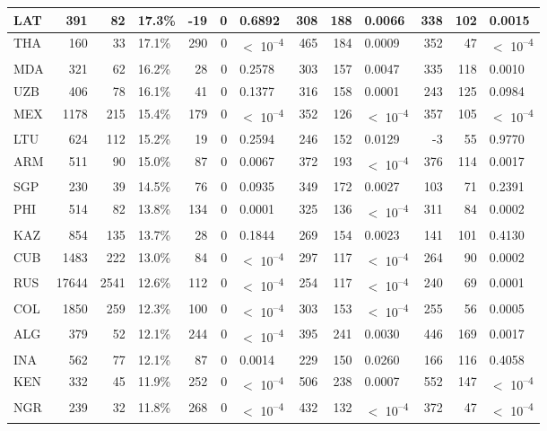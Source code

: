\begin{tabular}{l|r|r|l|r|r|l|r|r|l|r|r|l}
\hline
LAT & 391 & 82 & 17.3\% & -19 & 0 & 0.6892 & 308 & 188 & 0.0066 & 338 & 102 & 0.0015\\
\hline
THA & 160 & 33 & 17.1\% & 290 & 0 & $<$ 10\textsuperscript{--4} & 465 & 184 & 0.0009 & 352 & 47 & $<$ 10\textsuperscript{--4}\\
\hline
MDA & 321 & 62 & 16.2\% & 28 & 0 & 0.2578 & 303 & 157 & 0.0047 & 335 & 118 & 0.0010\\
\hline
UZB & 406 & 78 & 16.1\% & 41 & 0 & 0.1377 & 316 & 158 & 0.0001 & 243 & 125 & 0.0984\\
\hline
MEX & 1178 & 215 & 15.4\% & 179 & 0 & $<$ 10\textsuperscript{--4} & 352 & 126 & $<$ 10\textsuperscript{--4} & 357 & 105 & $<$ 10\textsuperscript{--4}\\
\hline
LTU & 624 & 112 & 15.2\% & 19 & 0 & 0.2594 & 246 & 152 & 0.0129 & -3 & 55 & 0.9770\\
\hline
ARM & 511 & 90 & 15.0\% & 87 & 0 & 0.0067 & 372 & 193 & $<$ 10\textsuperscript{--4} & 376 & 114 & 0.0017\\
\hline
SGP & 230 & 39 & 14.5\% & 76 & 0 & 0.0935 & 349 & 172 & 0.0027 & 103 & 71 & 0.2391\\
\hline
PHI & 514 & 82 & 13.8\% & 134 & 0 & 0.0001 & 325 & 136 & $<$ 10\textsuperscript{--4} & 311 & 84 & 0.0002\\
\hline
KAZ & 854 & 135 & 13.7\% & 28 & 0 & 0.1844 & 269 & 154 & 0.0023 & 141 & 101 & 0.4130\\
\hline
CUB & 1483 & 222 & 13.0\% & 84 & 0 & $<$ 10\textsuperscript{--4} & 297 & 117 & $<$ 10\textsuperscript{--4} & 264 & 90 & 0.0002\\
\hline
RUS & 17644 & 2541 & 12.6\% & 112 & 0 & $<$ 10\textsuperscript{--4} & 254 & 117 & $<$ 10\textsuperscript{--4} & 240 & 69 & 0.0001\\
\hline
COL & 1850 & 259 & 12.3\% & 100 & 0 & $<$ 10\textsuperscript{--4} & 303 & 153 & $<$ 10\textsuperscript{--4} & 255 & 56 & 0.0005\\
\hline
ALG & 379 & 52 & 12.1\% & 244 & 0 & $<$ 10\textsuperscript{--4} & 395 & 241 & 0.0030 & 446 & 169 & 0.0017\\
\hline
INA & 562 & 77 & 12.1\% & 87 & 0 & 0.0014 & 229 & 150 & 0.0260 & 166 & 116 & 0.4058\\
\hline
KEN & 332 & 45 & 11.9\% & 252 & 0 & $<$ 10\textsuperscript{--4} & 506 & 238 & 0.0007 & 552 & 147 & $<$ 10\textsuperscript{--4}\\
\hline
NGR & 239 & 32 & 11.8\% & 268 & 0 & $<$ 10\textsuperscript{--4} & 432 & 132 & $<$ 10\textsuperscript{--4} & 372 & 47 & $<$ 10\textsuperscript{--4}\\

\end{tabular}
